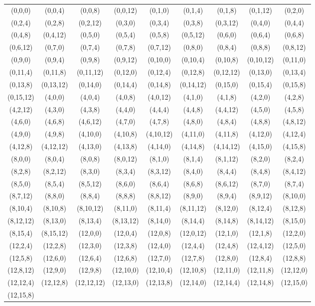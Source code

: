 \documentclass[11pt]{amsart}
\begin{document}
{
\begin{tiny}
\begin{tabular}{ccccccccc}
(0,0,0)&(0,0,4)&(0,0,8)&(0,0,12)&(0,1,0)&(0,1,4)&(0,1,8)&(0,1,12)&(0,2,0)\\
(0,2,4)&(0,2,8)&(0,2,12)&(0,3,0)&(0,3,4)&(0,3,8)&(0,3,12)&(0,4,0)&(0,4,4)\\
(0,4,8)&(0,4,12)&(0,5,0)&(0,5,4)&(0,5,8)&(0,5,12)&(0,6,0)&(0,6,4)&(0,6,8)\\
(0,6,12)&(0,7,0)&(0,7,4)&(0,7,8)&(0,7,12)&(0,8,0)&(0,8,4)&(0,8,8)&(0,8,12)\\
(0,9,0)&(0,9,4)&(0,9,8)&(0,9,12)&(0,10,0)&(0,10,4)&(0,10,8)&(0,10,12)&(0,11,0)\\
(0,11,4)&(0,11,8)&(0,11,12)&(0,12,0)&(0,12,4)&(0,12,8)&(0,12,12)&(0,13,0)&(0,13,4)\\
(0,13,8)&(0,13,12)&(0,14,0)&(0,14,4)&(0,14,8)&(0,14,12)&(0,15,0)&(0,15,4)&(0,15,8)\\
(0,15,12)&(4,0,0)&(4,0,4)&(4,0,8)&(4,0,12)&(4,1,0)&(4,1,8)&(4,2,0)&(4,2,8)\\
(4,2,12)&(4,3,0)&(4,3,8)&(4,4,0)&(4,4,4)&(4,4,8)&(4,4,12)&(4,5,0)&(4,5,8)\\
(4,6,0)&(4,6,8)&(4,6,12)&(4,7,0)&(4,7,8)&(4,8,0)&(4,8,4)&(4,8,8)&(4,8,12)\\
(4,9,0)&(4,9,8)&(4,10,0)&(4,10,8)&(4,10,12)&(4,11,0)&(4,11,8)&(4,12,0)&(4,12,4)\\
(4,12,8)&(4,12,12)&(4,13,0)&(4,13,8)&(4,14,0)&(4,14,8)&(4,14,12)&(4,15,0)&(4,15,8)\\
(8,0,0)&(8,0,4)&(8,0,8)&(8,0,12)&(8,1,0)&(8,1,4)&(8,1,12)&(8,2,0)&(8,2,4)\\
(8,2,8)&(8,2,12)&(8,3,0)&(8,3,4)&(8,3,12)&(8,4,0)&(8,4,4)&(8,4,8)&(8,4,12)\\
(8,5,0)&(8,5,4)&(8,5,12)&(8,6,0)&(8,6,4)&(8,6,8)&(8,6,12)&(8,7,0)&(8,7,4)\\
(8,7,12)&(8,8,0)&(8,8,4)&(8,8,8)&(8,8,12)&(8,9,0)&(8,9,4)&(8,9,12)&(8,10,0)\\
(8,10,4)&(8,10,8)&(8,10,12)&(8,11,0)&(8,11,4)&(8,11,12)&(8,12,0)&(8,12,4)&(8,12,8)\\
(8,12,12)&(8,13,0)&(8,13,4)&(8,13,12)&(8,14,0)&(8,14,4)&(8,14,8)&(8,14,12)&(8,15,0)\\
(8,15,4)&(8,15,12)&(12,0,0)&(12,0,4)&(12,0,8)&(12,0,12)&(12,1,0)&(12,1,8)&(12,2,0)\\
(12,2,4)&(12,2,8)&(12,3,0)&(12,3,8)&(12,4,0)&(12,4,4)&(12,4,8)&(12,4,12)&(12,5,0)\\
(12,5,8)&(12,6,0)&(12,6,4)&(12,6,8)&(12,7,0)&(12,7,8)&(12,8,0)&(12,8,4)&(12,8,8)\\
(12,8,12)&(12,9,0)&(12,9,8)&(12,10,0)&(12,10,4)&(12,10,8)&(12,11,0)&(12,11,8)&(12,12,0)\\
(12,12,4)&(12,12,8)&(12,12,12)&(12,13,0)&(12,13,8)&(12,14,0)&(12,14,4)&(12,14,8)&(12,15,0)\\
(12,15,8)&&&&&&&&
\end{tabular}
\end{tiny}}
\end{document}
